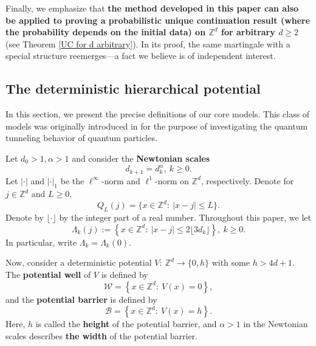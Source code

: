 \documentclass[11pt,reqno,UTF8,twoside]{amsart}
\newcommand{\Z}{\mathbb{Z}}
\newcommand{\mcB}{\mathcal{B}}
\newcommand{\mcW}{\mathcal{W}}
\theoremstyle{definition}
\numberwithin{equation}{section}
\begin{document}
Finally, we emphasize that \textbf{the method developed in this paper can also be applied to proving a probabilistic unique continuation result (where the probability depends on the initial data) on $\Z^d$ for arbitrary $d\geq 2$} (see Theorem \ref{UC for d arbitrary}). 
In its proof, the same martingale with a special structure reemerges—a fact we believe is of independent interest.


\subsection{The deterministic hierarchical potential}

In this section, we present the precise definitions of our core models. This class of models was originally introduced in \cite{JLMS84, JLMS85} for the purpose of investigating the quantum tunneling behavior of quantum particles.

Let $d_0>1,\alpha>1$ and consider the {\bf Newtonian scales}
\begin{equation}
    d_{k+1}=d_k^{\alpha} ,\  k\geq 0.
\end{equation}
Let $|\cdot|$ and $|\cdot|_1$ be the $\ell^\infty$-norm and $\ell^1$-norm on $\Z^d$, respectively. Denote for $j\in\Z^d$ and $L\geq 0, $
\[Q_L(j)=\{x\in \Z^d:\ |x-j|\leq L\}.\]
Denote by $\lfloor\cdot\rfloor$ by the integer part of a real number.  Throughout this paper, we let   %
\begin{equation}\label{k-th block}
  \Lambda_k(j):=\left\{ x\in \Z^d:\  |x-j|\leq 2\lfloor 3d_k \rfloor \right\},\  k\geq 0.
\end{equation}
In particular,  write  $\Lambda_k=\Lambda_k(0)$.

Now, consider a deterministic  potential $V:\ \Z^d\rightarrow \{0,h\}$ with some $h>4d+1$.
The \textbf{potential well} of $V$ is defined by 
\[
\mcW=\left\{x\in \Z^d:\  V(x)=0   \right\},
\]
and  the \textbf{potential barrier} is defined by 
\[
\mcB=\left\{x\in \Z^d: \ V(x)=h   \right\}.
\]
Here,    $h$ is called  the \textbf{height}  of the potential barrier, and 
 $\alpha>1$ in the Newtonian scales describes \textbf{the width} of the potential barrier.
\end{document}
